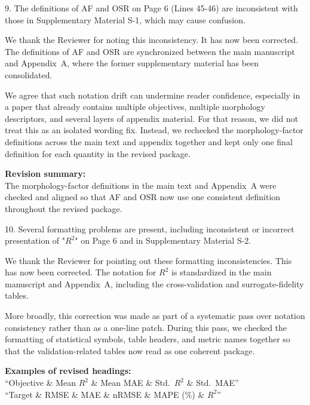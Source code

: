 \begin{ReviewerComment}
9. The definitions of AF and OSR on Page 6 (Lines 45-46) are inconsistent with those in Supplementary Material S-1, which may cause confusion.
\end{ReviewerComment}
%
\begin{Answer}
We thank the Reviewer for noting this inconsistency. It has now been corrected. The definitions of AF and OSR are synchronized between the main manuscript and Appendix~A, where the former supplementary material has been consolidated.

We agree that such notation drift can undermine reader confidence, especially in a paper that already contains multiple objectives, multiple morphology descriptors, and several layers of appendix material. For that reason, we did not treat this as an isolated wording fix. Instead, we rechecked the morphology-factor definitions across the main text and appendix together and kept only one final definition for each quantity in the revised package.
\end{Answer}
\begin{RevisionExcerpt}
\noindent\textbf{Revision summary:}\\
The morphology-factor definitions in the main text and Appendix~A were checked and aligned so that AF and OSR now use one consistent definition throughout the revised package.
\end{RevisionExcerpt}

\begin{ReviewerComment}
10. Several formatting problems are present, including inconsistent or incorrect presentation of "$R^2$" on Page 6 and in Supplementary Material S-2.
\end{ReviewerComment}
%
\begin{Answer}
We thank the Reviewer for pointing out these formatting inconsistencies. This has now been corrected. The notation for $R^2$ is standardized in the main manuscript and Appendix~A, including the cross-validation and surrogate-fidelity tables.

More broadly, this correction was made as part of a systematic pass over notation consistency rather than as a one-line patch. During this pass, we checked the formatting of statistical symbols, table headers, and metric names together so that the validation-related tables now read as one coherent package.
\end{Answer}
\begin{RevisionExcerpt}
\noindent\textbf{Examples of revised headings:}\\
``Objective \& Mean $R^2$ \& Mean MAE \& Std.\ $R^2$ \& Std.\ MAE''\\
``Target \& RMSE \& MAE \& nRMSE \& MAPE (\%) \& $R^2$''
\end{RevisionExcerpt}

